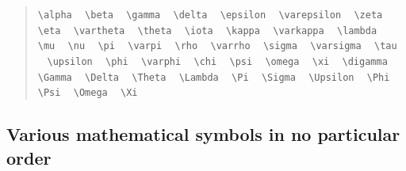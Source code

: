 \documentclass{article}
\newcommand{\texcommand}[1]{\textbackslash{}#1}
\newcommand{\spacer}{\,\,\, \hfil}
\newcommand{\lastspacer}{\hfill\hfill\hfill}
\newenvironment{mylist}{\begin{quote}}{\end{quote}}
\begin{document}
\begin{mylist}
\texttt{\texcommand{alpha}} \spacer
\texttt{\texcommand{beta}} \spacer
\texttt{\texcommand{gamma}} \spacer
\texttt{\texcommand{delta}} \spacer
\texttt{\texcommand{epsilon}} \spacer
\texttt{\texcommand{varepsilon}} \spacer
\texttt{\texcommand{zeta}} \spacer
\texttt{\texcommand{eta}} \spacer
\texttt{\texcommand{vartheta}} \spacer
\texttt{\texcommand{theta}} \spacer
\texttt{\texcommand{iota}} \spacer
\texttt{\texcommand{kappa}} \spacer
\texttt{\texcommand{varkappa}} \spacer
\texttt{\texcommand{lambda}} \spacer
\texttt{\texcommand{mu}} \spacer
\texttt{\texcommand{nu}} \spacer
\texttt{\texcommand{pi}} \spacer
\texttt{\texcommand{varpi}} \spacer
\texttt{\texcommand{rho}} \spacer
\texttt{\texcommand{varrho}} \spacer
\texttt{\texcommand{sigma}} \spacer
\texttt{\texcommand{varsigma}} \spacer
\texttt{\texcommand{tau}} \spacer
\texttt{\texcommand{upsilon}} \spacer
\texttt{\texcommand{phi}} \spacer
\texttt{\texcommand{varphi}} \spacer
\texttt{\texcommand{chi}} \spacer
\texttt{\texcommand{psi}} \spacer
\texttt{\texcommand{omega}} \spacer
\texttt{\texcommand{xi}} \spacer
\texttt{\texcommand{digamma}} \spacer
\texttt{\texcommand{Gamma}} \spacer
\texttt{\texcommand{Delta}} \spacer
\texttt{\texcommand{Theta}} \spacer
\texttt{\texcommand{Lambda}} \spacer
\texttt{\texcommand{Pi}} \spacer
\texttt{\texcommand{Sigma}} \spacer
\texttt{\texcommand{Upsilon}} \spacer
\texttt{\texcommand{Phi}} \spacer
\texttt{\texcommand{Psi}} \spacer
\texttt{\texcommand{Omega}} \spacer
\texttt{\texcommand{Xi}} \lastspacer
\end{mylist}

\subsection{Various mathematical symbols in no particular order}
\end{document}
